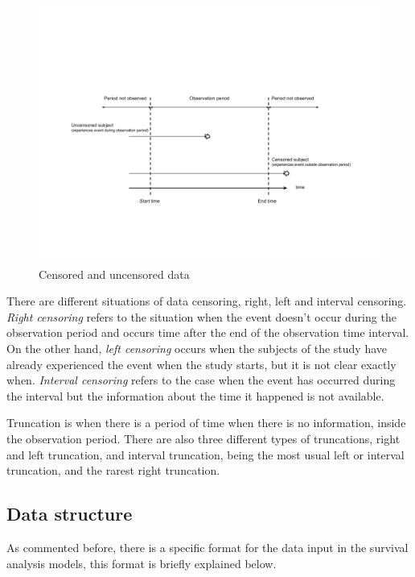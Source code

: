 \documentclass[11pt]{book} %
\begin{document}
      \begin{figure}[!ht]
        \includegraphics[width=\textwidth]{Data_censoring.png}
        \caption{Censored and uncensored data}
        \label{img:data_censoring}
      \end{figure}

      There are different situations of data censoring, right, left and interval censoring. \emph{Right censoring} refers to the situation when the event doesn't occur during the observation period and occurs time after the end of the observation time interval. On the other hand, \emph{left censoring} occurs when the subjects of the study have already experienced the event when the study starts, but it is not clear exactly when. \emph{Interval censoring} refers to the case when the event has occurred during the interval but the information about the time it happened is not available.

      Truncation is when there is a period of time when there is no information, inside the observation period. There are also three different types of truncations, right and left truncation, and interval truncation, being the most usual left or interval truncation, and the rarest right truncation.

    \subsection{Data structure}

      As commented before, there is a specific format for the data input in the survival analysis models, this format is briefly explained below.
\end{document}
